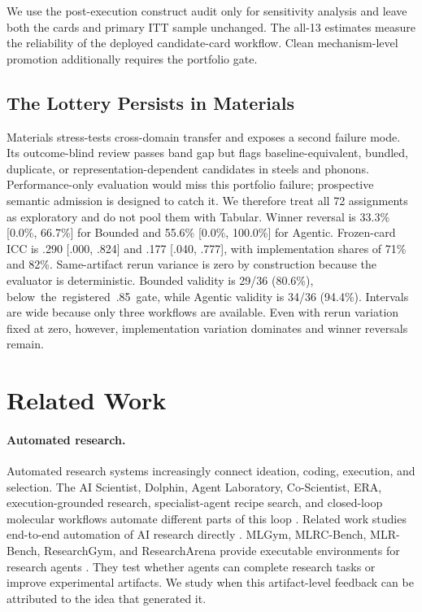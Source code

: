 \documentclass[letterpaper]{article}
\begin{document}
We use the post-execution construct audit only for sensitivity analysis and leave both the cards and primary ITT sample unchanged. The all-13 estimates measure the reliability of the deployed candidate-card workflow. Clean mechanism-level promotion additionally requires the portfolio gate.

\subsection{The Lottery Persists in Materials}
\label{sec:materials}

Materials stress-tests cross-domain transfer and exposes a second failure mode. Its outcome-blind review passes band gap but flags baseline-equivalent, bundled, duplicate, or representation-dependent candidates in steels and phonons. Performance-only evaluation would miss this portfolio failure; prospective semantic admission is designed to catch it. We therefore treat all 72 assignments as exploratory and do not pool them with Tabular. Winner reversal is 33.3\% [0.0\%, 66.7\%] for Bounded and 55.6\% [0.0\%, 100.0\%] for Agentic. Frozen-card ICC is .290 [.000, .824] and .177 [.040, .777], with implementation shares of 71\% and 82\%. Same-artifact rerun variance is zero by construction because the evaluator is deterministic. Bounded validity is 29/36 (80.6\%), \mbox{below the registered .85 gate}, while Agentic validity is 34/36 (94.4\%). Intervals are wide because only three workflows are available. Even with rerun variation fixed at zero, however, implementation variation dominates and winner reversals remain.

\section{Related Work}

\paragraph{Automated research.} Automated research systems increasingly connect ideation, coding, execution, and selection. The AI Scientist, Dolphin, Agent Laboratory, Co-Scientist, ERA, execution-grounded research, specialist-agent recipe search, and closed-loop molecular workflows automate different parts of this loop \cite{lu2024aiscientist,yuan2025dolphin,schmidgall2025agentlab,gottweis2026coscientist,aygun2026era,si2026executiongrounded,ning2026specialists,ning2026molecular}. Related work studies end-to-end automation of AI research directly \cite{lu2026automation}. MLGym, MLRC-Bench, MLR-Bench, ResearchGym, and ResearchArena provide executable environments for research agents \cite{nathani2025mlgym,zhang2025mlrcbench,chen2025mlrbench,garikaparthi2026researchgym,zhang2026researcharena}. They test whether agents can complete research tasks or improve experimental artifacts. We study when this artifact-level feedback can be attributed to the idea that generated it.
\end{document}
